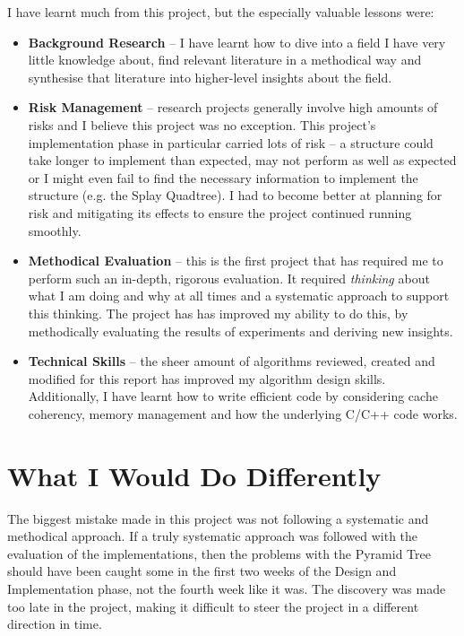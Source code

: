 I have learnt much from this project, but the especially valuable lessons were:
\begin{itemize}
	\item \textbf{Background Research} -- I have learnt how to dive into a field I have very little knowledge about, find relevant literature in a methodical way and synthesise that literature into higher-level insights about the field.
	\item \textbf{Risk Management} -- research projects generally involve high amounts of risks and I believe this project was no exception. This project's implementation phase in particular carried lots of risk -- a structure could take longer to implement than expected, may not perform as well as expected or I might even fail to find the necessary information to implement the structure (e.g. the Splay Quadtree). I had to become better at planning for risk and mitigating its effects to ensure the project continued running smoothly.
	\item \textbf{Methodical Evaluation} -- this is the first project that has required me to perform such an in-depth, rigorous evaluation. It required \textit{thinking} about what I am doing and why at all times and a systematic approach to support this thinking. The project has has improved my ability to do this, by methodically evaluating the results of experiments and deriving new insights.
	\item \textbf{Technical Skills} -- the sheer amount of algorithms reviewed, created and modified for this report has improved my algorithm design skills. Additionally, I have learnt how to write efficient code by considering cache coherency, memory management and how the underlying C/C++ code works.
\end{itemize}

\section{What I Would Do Differently}

The biggest mistake made in this project was not following a systematic and methodical approach. If a truly systematic approach was followed with the evaluation of the implementations, then the problems with the Pyramid Tree should have been caught some in the first two weeks of the Design and Implementation phase, not the fourth week like it was. The discovery was made too late in the project, making it difficult to steer the project in a different direction in time.


